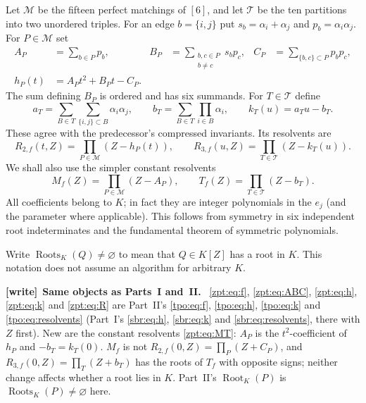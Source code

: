 \documentclass[11pt,letterpaper]{article}
\numberwithin{equation}{section}
\theoremstyle{definition}
\theoremstyle{remark}
\newcommand{\Rtwo}{R_{2,f}}
\newcommand{\Rthree}{R_{3,f}}
\newcommand{\tpoM}{\mathcal M}
\newcommand{\tpoT}{\mathcal T}
\DeclareMathOperator{\Roots}{Roots}
\newcommand{\Ares}{M_f}\newcommand{\Tres}{T_f}
\newcommand{\roots}[1]{\Roots_K(#1)}
\newenvironment{writenote}[1][]{\par\smallskip\begingroup\small
 \noindent\textbf{[write]}\if\relax\detokenize{#1}\relax\else~\textbf{#1.}\fi\ }%
 {\par\endgroup\smallskip}
\begin{document}
Let $\tpoM$ be the fifteen perfect matchings of $[6]$, and let $\tpoT$ be the ten
partitions into two unordered triples. For an edge $b=\{i,j\}$ put
$s_b=\alpha_i+\alpha_j$ and $p_b=\alpha_i\alpha_j$. For $P\in\tpoM$ set
\begin{align}
 A_P&=\sum_{b\in P}p_b, &
 B_P&=\sum_{\substack{b,c\in P\\b\ne c}}s_b p_c, &
 C_P&=\sum_{\{b,c\}\subset P}p_b p_c,\label{zpt:eq:ABC}\\
 h_P(t)&=A_Pt^2+B_Pt-C_P.\label{zpt:eq:h}
\end{align}
The sum defining $B_P$ is ordered and has six summands. For $T\in\tpoT$ define
\begin{equation}
 a_T=\sum_{B\in T}\sum_{\{i,j\}\subset B}\alpha_i\alpha_j,
 \qquad b_T=\sum_{B\in T}\prod_{i\in B}\alpha_i,
 \qquad k_T(u)=a_Tu-b_T.\label{zpt:eq:k}
\end{equation}
These agree with the predecessor's compressed invariants. Its resolvents are
\begin{equation}
 \Rtwo(t,Z)=\prod_{P\in\tpoM}(Z-h_P(t)),\qquad
 \Rthree(u,Z)=\prod_{T\in\tpoT}(Z-k_T(u)).\label{zpt:eq:R}
\end{equation}
We shall also use the simpler constant resolvents
\begin{equation}
 \Ares(Z)=\prod_{P\in\tpoM}(Z-A_P),\qquad
 \Tres(Z)=\prod_{T\in\tpoT}(Z-b_T).\label{zpt:eq:MT}
\end{equation}
All coefficients belong to $K$; in fact they are integer polynomials in the
$e_j$ (and the parameter where applicable). This follows from symmetry in
six independent root indeterminates and the fundamental theorem of
symmetric polynomials.

Write $\roots{Q}\ne\varnothing$ to mean that $Q\in K[Z]$ has a root in $K$.
This notation does not assume an algorithm for arbitrary $K$.

\begin{writenote}[Same objects as Parts~I and~II]
\eqref{zpt:eq:f}, \eqref{zpt:eq:ABC}, \eqref{zpt:eq:h}, \eqref{zpt:eq:k}
and \eqref{zpt:eq:R} are Part~II's \eqref{tpo:eq:f}, \eqref{tpo:eq:h},
\eqref{tpo:eq:k} and \eqref{tpo:eq:resolvents} (Part~I's \eqref{sbr:eq:h},
\eqref{sbr:eq:k} and \eqref{sbr:eq:resolvents}, there with $Z$ first). New
are the constant resolvents \eqref{zpt:eq:MT}: $A_P$ is the
$t^2$-coefficient of $h_P$ and $-b_T=k_T(0)$. $M_f$ is not
$\Rtwo(0,Z)=\prod_P(Z+C_P)$, and $\Rthree(0,Z)=\prod_T(Z+b_T)$ has the
roots of $T_f$ with opposite signs; neither change affects whether a root
lies in $K$. Part~II's $\operatorname{Root}_K(P)$ is $\roots{P}\ne\varnothing$
here.
\end{writenote}
\end{document}
